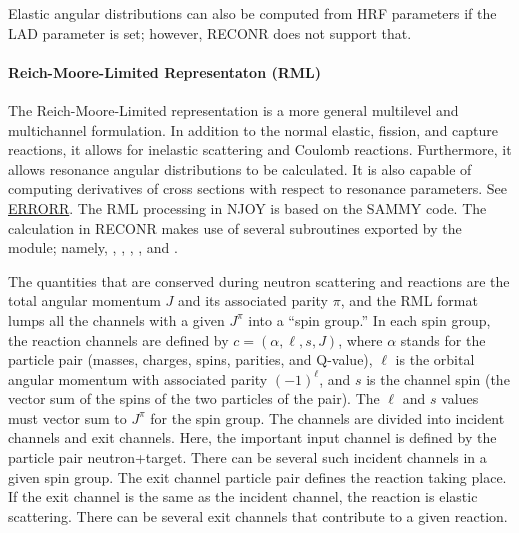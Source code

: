 Elastic angular distributions can also be computed from HRF
parameters if the LAD parameter is set;  however, RECONR does not
support that.

\paragraph{Reich-Moore-Limited Representaton (RML)}
  The Reich-Moore-Limited representation is a more
general multilevel and multichannel formulation. In addition to the
normal elastic, fission, and capture reactions, it allows for
inelastic scattering and Coulomb reactions.  Furthermore,
it allows resonance angular distributions to be calculated.
It is also capable of computing derivatives of cross sections
with respect to resonance parameters.  See
\hyperlink{sERRORRhy}{ERRORR}.  The RML
processing in NJOY is based on the SAMMY code\cite{SAMMY}.
The calculation in RECONR makes use of several subroutines
exported by the  module;
namely, , , ,
, and .

The quantities that are conserved during neutron scattering and
reactions are the total angular momentum $J$ and its associated
parity $\pi$, and the RML format lumps all the channels with
a given $J^\pi$ into a ``spin group.'' In
each spin group, the reaction channels are defined by
$c=(\alpha,\ell,s,J)$, where $\alpha$ stands for the
particle pair (masses, charges, spins, parities, and Q-value),
$\ell$ is the orbital angular momentum with associated
parity $(-1)^\ell$, and $s$ is the channel spin (the
vector sum of the spins of the two particles of the pair).  The
$\ell$ and $s$ values must vector sum to $J^\pi$ for the spin group.
The channels are divided into incident channels and exit
channels.  Here, the important input channel is defined by the
particle pair neutron+target.  There can be several such
incident channels in a given spin group.  The exit channel
particle pair defines the reaction taking place.  If the
exit channel is the same as the incident channel, the reaction
is elastic scattering.  There can be several exit channels
that contribute to a given reaction.

